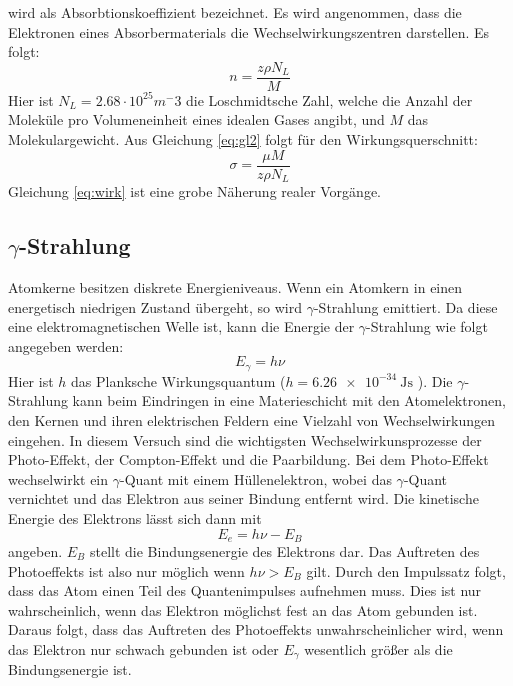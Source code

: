 wird als Absorbtionskoeffizient bezeichnet.
Es wird angenommen, dass die Elektronen eines Absorbermaterials die Wechselwirkungszentren darstellen.
Es folgt:
\begin{equation}
  n= \frac{z \rho N_L}{M}
  \label{eq:gl2}
\end{equation}
Hier ist $N_L=2.68\cdot 10^{25} m^-3$ \cite{Nl} die Loschmidtsche Zahl, welche die Anzahl der Moleküle pro Volumeneinheit eines idealen Gases angibt, und $M$ das Molekulargewicht.
Aus Gleichung \eqref{eq:gl2} folgt für den Wirkungsquerschnitt:
\begin{equation}
  \sigma=\frac{\mu M}{z \rho N_L}
  \label{eq:wirk}
\end{equation}
Gleichung \eqref{eq:wirk} ist eine grobe Näherung realer Vorgänge.
%
\subsection{\texorpdfstring{$\gamma$}{Gamma}-Strahlung}
Atomkerne besitzen diskrete Energieniveaus.
Wenn ein Atomkern in einen energetisch niedrigen Zustand übergeht, so wird $\gamma$-Strahlung emittiert.
Da diese eine elektromagnetischen Welle ist, kann die Energie der $\gamma$-Strahlung
wie folgt angegeben werden:
\begin{equation}
  E_\gamma = h\nu
\end{equation}
Hier ist $h$ das Planksche Wirkungsquantum ($h=\SI{6.26e-34}{\joule\second}$ \cite{planck}).
Die $\gamma$-Strahlung kann beim Eindringen in eine Materieschicht mit den Atomelektronen, den Kernen und ihren elektrischen Feldern eine Vielzahl von Wechselwirkungen eingehen.
In diesem Versuch sind die wichtigsten Wechselwirkunsprozesse der Photo-Effekt, der Compton-Effekt und die Paarbildung.
Bei dem Photo-Effekt wechselwirkt ein $\gamma$-Quant mit einem Hüllenelektron, wobei das $\gamma$-Quant vernichtet und das Elektron aus seiner Bindung entfernt wird.
Die kinetische Energie des Elektrons lässt sich dann mit
\begin{equation}
  E_e = h\nu - E_B
\end{equation}
angeben.
$E_B$ stellt die Bindungsenergie des Elektrons dar.
Das Auftreten des Photoeffekts ist also nur möglich wenn $h\nu > E_B$ gilt.
Durch den Impulssatz folgt, dass das Atom einen Teil des Quantenimpulses aufnehmen muss.
Dies ist nur wahrscheinlich, wenn das Elektron möglichst fest an das Atom gebunden ist.
Daraus folgt, dass das Auftreten des Photoeffekts unwahrscheinlicher wird, wenn das Elektron nur schwach gebunden ist 
oder $E_\gamma$ wesentlich größer als die Bindungsenergie ist.


